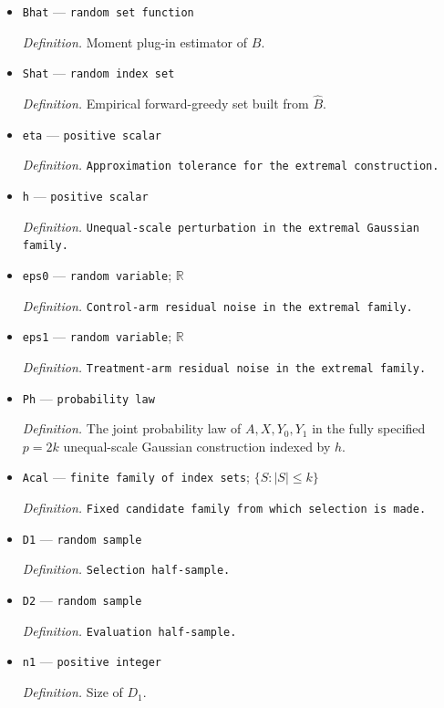 \documentclass{article}
\begin{document}
\begin{itemize}
  \item \texttt{Bhat} --- \texttt{random set function}
  \par\smallskip\noindent\emph{Definition.} Moment plug-in estimator of \(B\).
  \item \texttt{Shat} --- \texttt{random index set}
  \par\smallskip\noindent\emph{Definition.} Empirical forward-greedy set built from \(\widehat B\).
  \item \texttt{eta} --- \texttt{positive scalar}
  \par\smallskip\noindent\emph{Definition.} \texttt{Approximation tolerance for the extremal construction.}
  \item \texttt{h} --- \texttt{positive scalar}
  \par\smallskip\noindent\emph{Definition.} \texttt{Unequal-\allowbreak{}scale perturbation in the extremal Gaussian family.}
  \item \texttt{eps0} --- \texttt{random variable}; \(\mathbb R\)
  \par\smallskip\noindent\emph{Definition.} \texttt{Control-\allowbreak{}arm residual noise in the extremal family.}
  \item \texttt{eps1} --- \texttt{random variable}; \(\mathbb R\)
  \par\smallskip\noindent\emph{Definition.} \texttt{Treatment-\allowbreak{}arm residual noise in the extremal family.}
  \item \texttt{Ph} --- \texttt{probability law}
  \par\smallskip\noindent\emph{Definition.} The joint probability law of \(A,X,Y_0,Y_1\) in the fully specified \(p=2k\) unequal-scale Gaussian construction indexed by \(h\).
  \item \texttt{Acal} --- \texttt{finite family of index sets}; \(\{S:|S|\le k\}\)
  \par\smallskip\noindent\emph{Definition.} \texttt{Fixed candidate family from which selection is made.}
  \item \texttt{D1} --- \texttt{random sample}
  \par\smallskip\noindent\emph{Definition.} \texttt{Selection half-\allowbreak{}sample.}
  \item \texttt{D2} --- \texttt{random sample}
  \par\smallskip\noindent\emph{Definition.} \texttt{Evaluation half-\allowbreak{}sample.}
  \item \texttt{n1} --- \texttt{positive integer}
  \par\smallskip\noindent\emph{Definition.} Size of \(D_1\).

\end{itemize}
\end{document}
